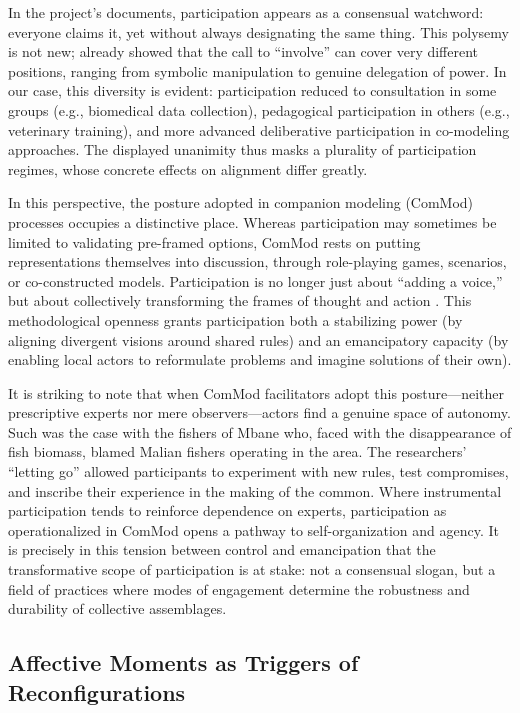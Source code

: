 \documentclass{article}
\begin{document}
In the project’s documents, participation appears as a consensual watchword: everyone claims it, yet without always designating the same thing. This polysemy is not new; \textcite{arnstein_ladder_1969} already showed that the call to “involve” can cover very different positions, ranging from symbolic manipulation to genuine delegation of power. In our case, this diversity is evident: participation reduced to consultation in some groups (e.g., biomedical data collection), pedagogical participation in others (e.g., veterinary training), and more advanced deliberative participation in co-modeling approaches. The displayed unanimity thus masks a plurality of participation regimes, whose concrete effects on alignment differ greatly.  

In this perspective, the posture adopted in companion modeling (ComMod) processes \parencite{barreteau_our_2003, barreteau_framework_2010} occupies a distinctive place. Whereas participation may sometimes be limited to validating pre-framed options, ComMod rests on putting representations themselves into discussion, through role-playing games, scenarios, or co-constructed models. Participation is no longer just about “adding a voice,” but about collectively transforming the frames of thought and action \parencite{etienne_modepour_2010}. This methodological openness grants participation both a stabilizing power (by aligning divergent visions around shared rules) and an emancipatory capacity (by enabling local actors to reformulate problems and imagine solutions of their own).  

It is striking to note that when ComMod facilitators adopt this posture—neither prescriptive experts nor mere observers—actors find a genuine space of autonomy. Such was the case with the fishers of Mbane who, faced with the disappearance of fish biomass, blamed Malian fishers operating in the area. The researchers’ “letting go” allowed participants to experiment with new rules, test compromises, and inscribe their experience in the making of the common. Where instrumental participation tends to reinforce dependence on experts, participation as operationalized in ComMod opens a pathway to self-organization and agency. It is precisely in this tension between control and emancipation that the transformative scope of participation is at stake: not a consensual slogan, but a field of practices where modes of engagement determine the robustness and durability of collective assemblages.  

\subsection{Affective Moments as Triggers of Reconfigurations}
\end{document}
